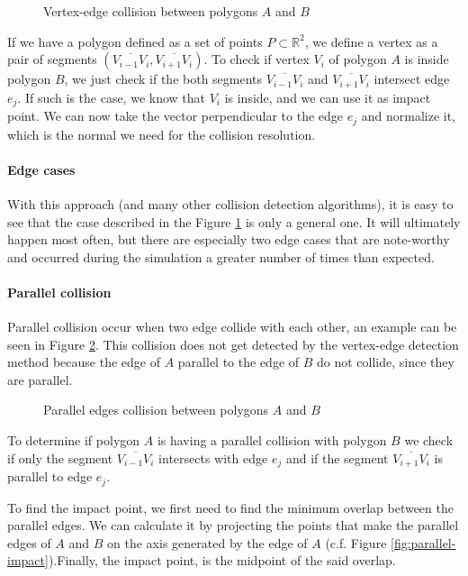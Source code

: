\begin{figure}[H]
	\centering
	\caption{Vertex-edge collision between polygons $A$ and $B$}
	\label{fig:vertex-edge}
\end{figure}

If we have a polygon defined as a set of points $P \subset \mathbb{R}^2$, we
define a vertex as a pair of segments $\left(\overline{V_{i-1}V_i},
	\overline{V_{i+1}V_i}\right)$. To check if vertex $V_i$ of polygon $A$ is inside
polygon $B$, we just check if the both segments $\overline{V_{i-1}V_i}$ and
$\overline{V_{i+1}V_i}$ intersect edge $e_j$. If such is the case, we know that
$V_i$ is inside, and we can use it as impact point. We can now take the vector
perpendicular to the edge $e_j$ and normalize it, which is the normal we need
for the collision resolution.


\paragraph{Edge cases} With this approach (and many other collision detection
algorithms), it is easy to see that the case described in the Figure
\ref{fig:vertex-edge} is only a general one. It will ultimately happen most
often, but there are especially two edge cases that are note-worthy and occurred
during the simulation a greater number of times than expected.

\paragraph{Parallel collision} Parallel collision occur when two edge collide
with each other, an example can be seen in Figure \ref{fig:vertex-parallel}.
This collision does not get detected by the vertex-edge detection method because
the edge of $A$ parallel to the edge of $B$ do not collide, since they are
parallel.

\begin{figure}[H]
	\centering
	\caption{Parallel edges collision between polygons $A$ and $B$}
	\label{fig:vertex-parallel}
\end{figure}

To determine if polygon $A$ is having a parallel collision with polygon $B$ we
check if only the segment $\overline{V_{i-1}V_i}$ intersects with edge $e_j$ and
if the segment $\overline{V_{i+1}V_i}$ is parallel to edge $e_j$.

To find the impact point, we first need to find the minimum overlap between the
parallel edges. We can calculate it by projecting the points that make the
parallel edges of $A$ and $B$ on the axis generated by the edge of $A$ (c.f.
Figure \ref{fig:parallel-impact}).Finally, the impact point, is the midpoint of
the said overlap.

